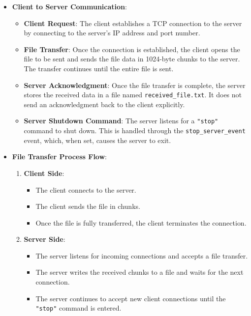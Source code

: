 \documentclass{article}
\begin{document}
\begin{itemize}
    \item \textbf{Client to Server Communication}:
    \begin{itemize}
        \item \textbf{Client Request}: The client establishes a TCP connection to the server by connecting to the server’s IP address and port number.
        \item \textbf{File Transfer}: Once the connection is established, the client opens the file to be sent and sends the file data in 1024-byte chunks to the server. The transfer continues until the entire file is sent.
        \item \textbf{Server Acknowledgment}: Once the file transfer is complete, the server stores the received data in a file named \texttt{received\_file.txt}. It does not send an acknowledgment back to the client explicitly.
        \item \textbf{Server Shutdown Command}: The server listens for a \texttt{"stop"} command to shut down. This is handled through the \texttt{stop\_server\_event} event, which, when set, causes the server to exit.
    \end{itemize}
    \item \textbf{File Transfer Process Flow}:
    \begin{enumerate}
        \item \textbf{Client Side}:
        \begin{itemize}
            \item The client connects to the server.
            \item The client sends the file in chunks.
            \item Once the file is fully transferred, the client terminates the connection.
        \end{itemize}
        \item \textbf{Server Side}:
        \begin{itemize}
            \item The server listens for incoming connections and accepts a file transfer.
            \item The server writes the received chunks to a file and waits for the next connection.
            \item The server continues to accept new client connections until the \texttt{"stop"} command is entered.
        \end{itemize}
    \end{enumerate}
\end{itemize}
\end{document}
